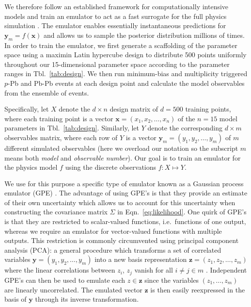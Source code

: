 \documentclass[aps,prc,reprint,amsmath,nofootinbib]{revtex4-1}
\newcommand{\x}{\mathbf{x}}
\newcommand{\y}{\mathbf{y}}
\newcommand{\z}{\mathbf{z}}
\begin{document}
We therefore follow an established framework for computationally intensive models and train an emulator to act as a fast surrogate for the full physics simulation \cite{OHagan:2006ba, Higdon:2008cmc, Higdon:2014tva}.
The emulator enables essentially instantaneous predictions for $\y_m = f(\x)$ and allows us to sample the posterior distribution millions of times.
In order to train the emulator, we first generate a scaffolding of the parameter space using a maximin Latin hypercube design \cite{Morris:1995lh} to distribute 500 points uniformly throughout our 15-dimensional parameter space according to the parameter ranges in Tbl.~\ref{tab:design}.
We then run minimum-bias and multiplicity triggered $p$-Pb and Pb-Pb events at each design point and calculate the model observables from the ensemble of events.

Specifically, let $X$ denote the ${d \times n}$ design matrix of $d=500$ training points, where each training point is a vector $\x = (x_1, x_2, \dots, x_n)$ of the $n=15$ model parameters in Tbl.~\ref{tab:design}.
Similarly, let $Y$ denote the corresponding ${d \times m}$ observables matrix, where each row of $Y$ is a vector $\y_m = (y_1, y_2, \dots, y_m)$ of $m$ different simulated observables (here we overload our notation so the subscript $m$ means both \emph{model} and \emph{observable number}).
Our goal is to train an emulator for the physics model $f$ using the discrete observations $f: X \mapsto Y$.

We use for this purpose a specific type of emulator known as a Gaussian process emulator (GPE) \cite{Rasmussen:2006gp}.
The advantage of using GPE's is that they provide an estimate of their own uncertainty which allows us to account for this uncertainty when constructing the covariance matrix $\Sigma$ in Eqn.~\eqref{eq:likelihood}.
One quirk of GPE's is that they are restricted to scalar-valued functions, i.e.\ functions of one output, whereas we require an emulator for vector-valued functions with multiple outputs.
This restriction is commonly circumvented using principal component analysis (PCA): a general procedure which transforms a set of correlated variables $\y = (y_1, y_2, \dots, y_m)$ into a new basis representation $\z = (z_1, z_2, \dots, z_m)$ where the linear correlations between $z_i$, $z_j$ vanish for all $i\ne j \in m$ \cite{Tipping:1999}.
Independent GPE's can then be used to emulate each $z \in \z$ since the variables $(z_1, \dots, z_m)$ are linearly uncorrelated.
The emulated vector $\z$ is then easily reexpressed in the basis of $\y$ through its inverse transformation.
\end{document}
